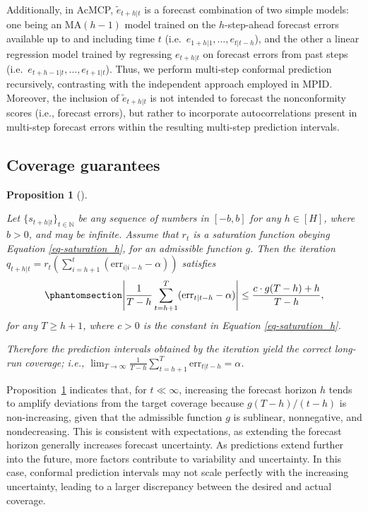 \documentclass[
  11pt,
  12pt]{article}
\theoremstyle{plain}
\newtheorem{proposition}{Proposition}[section]
\theoremstyle{remark}
\begin{document}
Additionally, in AcMCP, \(\tilde{e}_{t+h|t}\) is a forecast combination
of two simple models: one being an MA\((h-1)\) model trained on the
\(h\)-step-ahead forecast errors available up to and including time
\(t\) (i.e.~\(e_{1+h|1}, \ldots, e_{t|t-h}\)), and the other a linear
regression model trained by regressing \(e_{t+h|t}\) on forecast errors
from past steps (i.e.~\(e_{t+h-1|t}, \ldots, e_{t+1|t}\)). Thus, we
perform multi-step conformal prediction recursively, contrasting with
the independent approach employed in MPID. Moreover, the inclusion of
\(\tilde{e}_{t+h|t}\) is not intended to forecast the nonconformity
scores (i.e., forecast errors), but rather to incorporate
autocorrelations present in multi-step forecast errors within the
resulting multi-step prediction intervals.

\subsection{Coverage guarantees}\label{coverage-guarantees}

\begin{proposition}[]\protect\hypertarget{prp-cov_rt}{}\label{prp-cov_rt}

Let \(\{s_{t+h|t}\}_{t\in\mathbb{N}}\) be any sequence of numbers in
\([-b, b]\) for any \(h\in[H]\), where \(b>0\), and may be infinite.
Assume that \(r_t\) is a saturation function obeying Equation
\eqref{eq-saturation_h}, for an admissible function \(g\). Then the
iteration
\(q_{t+h|t}=r_t\left(\sum_{i=h+1}^t(\mathrm{err}_{i|i-h}-\alpha)\right)\)
satisfies \begin{equation}\phantomsection\label{eq-cov_rt}{
\left|\frac{1}{T-h}\sum_{t=h+1}^{T}(\mathrm{err}_{t|t-h}-\alpha)\right| \leq \frac{c \cdot g(T-h) + h}{T-h},
}\end{equation} for any \(T \geq h+1\), where \(c>0\) is the constant in
Equation \eqref{eq-saturation_h}.

Therefore the prediction intervals obtained by the iteration yield the
correct long-run coverage; i.e.,
\(\lim _{T \rightarrow \infty} \frac{1}{T-h} \sum_{t=h+1}^T \mathrm{err}_{t|t-h} = \alpha\).

\end{proposition}

Proposition~\ref{prp-cov_rt} indicates that, for \(t \ll \infty\),
increasing the forecast horizon \(h\) tends to amplify deviations from
the target coverage because \(g(T-h)/(t-h)\) is non-increasing, given
that the admissible function \(g\) is sublinear, nonnegative, and
nondecreasing. This is consistent with expectations, as extending the
forecast horizon generally increases forecast uncertainty. As
predictions extend further into the future, more factors contribute to
variability and uncertainty. In this case, conformal prediction
intervals may not scale perfectly with the increasing uncertainty,
leading to a larger discrepancy between the desired and actual coverage.
\end{document}
